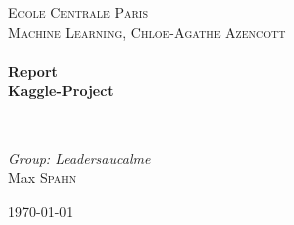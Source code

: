 \begin{titlepage}
\begin{center}



\textsc{\LARGE Ecole Centrale Paris}\\[1.5cm]

\textsc{\Large Machine Learning, Chloe-Agathe Azencott}\\[0.5cm]

\HRule \\[0.4cm]
{ \huge \bfseries Report \\ Kaggle-Project \\[0.4cm] }

\HRule \\[1.5cm]

\begin{center} \large
\emph{Group: Leadersaucalme }\\
Max \textsc{Spahn}
\end{center}

\vfill

{\large \today}

\end{center}
\end{titlepage}
